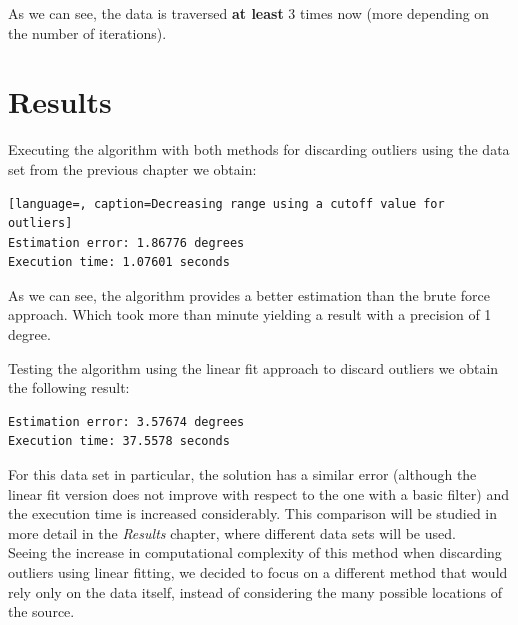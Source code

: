As we can see, the data is traversed \textbf{at least} 3 times now (more depending on the number of iterations).

\section{Results}

Executing the algorithm with both methods for discarding outliers using the data set from the previous chapter we obtain:

\begin{minipage}{\linewidth}
\begin{lstlisting}[language=, caption=Decreasing range using a cutoff value for outliers]
Estimation error: 1.86776 degrees
Execution time: 1.07601 seconds
\end{lstlisting}
\end{minipage}

As we can see, the algorithm provides a better estimation than the brute force approach. Which took more than minute yielding a result with a precision of 1 degree.

Testing the algorithm using the linear fit approach to discard outliers we obtain the following result:

\begin{minipage}{\linewidth}
\begin{lstlisting}[caption=Decreasing range using linear fit for outliers]
Estimation error: 3.57674 degrees
Execution time: 37.5578 seconds 
\end{lstlisting}
\end{minipage}

For this data set in particular, the solution has a similar error (although the linear fit version does not improve with respect to the one with a basic filter) and the execution time is increased considerably. This comparison will be studied in more detail in the \textit{Results} chapter, where different data sets will be used. \\

Seeing the increase in computational complexity of this method when discarding outliers using linear fitting, we decided to focus on a different method that would rely only on the data itself, instead of considering the many possible locations of the source.
